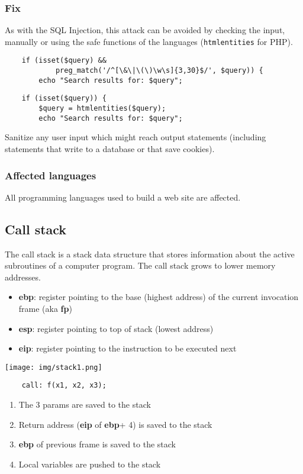 \documentclass[a4paper, 10pt, titlepage]{article}
\begin{document}
\subsubsection*{Fix}
As with the SQL Injection, this attack can be avoided by checking the input, manually or using the safe functions of the languages (\lstinline|htmlentities| for PHP).	
\begin{lstlisting}
	if (isset($query) &&
			preg_match('/^[\&\|\(\)\w\s]{3,30}$/', $query)) {
		echo "Search results for: $query";
\end{lstlisting}
\begin{lstlisting}
	if (isset($query)) {
		$query = htmlentities($query);
		echo "Search results for: $query";
\end{lstlisting}
Sanitize any user input which might reach output statements (including statements that write to a database or that save cookies).

\subsubsection*{Affected languages}
All programming languages used to build a web site are affected.
	
\subsection*{Call stack}
The call stack is a stack data structure that stores information about the active subroutines of a computer program. The call stack grows to lower memory addresses.
\begin{itemize}
	\item \textbf{ebp}: register pointing to the base (highest address) of the current invocation frame (aka \textbf{fp}) 
	\item \textbf{esp}: register pointing to top of stack (lowest address) 
	\item \textbf{eip}: register pointing to the instruction to be executed next
\end{itemize} \medskip
\begin{minipage}{0.35\textwidth}
\texttt{[image: img/stack1.png]}
\end{minipage} \hfill
\begin{minipage}{0.6\textwidth}
\begin{verbatim}
	call: f(x1, x2, x3);
\end{verbatim}
\begin{enumerate}
\item The 3 params are saved to the stack
\item Return address (\textbf{eip} of \textbf{ebp}+ 4) is saved to the stack 
\item \textbf{ebp} of previous frame is saved to the stack
\item Local variables are pushed to the stack
\end{enumerate}
\end{minipage}\medskip
	
\end{document}
